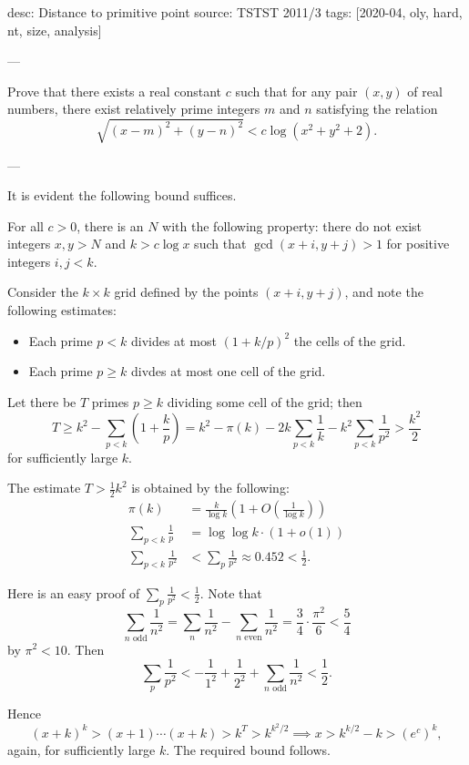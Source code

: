 desc: Distance to primitive point
source: TSTST 2011/3
tags: [2020-04, oly, hard, nt, size, analysis]

---

Prove that there exists a real constant $c$ such that for any pair $(x,y)$ of real numbers, there exist relatively prime integers $m$ and $n$ satisfying the relation \[\sqrt{(x-m)^2+(y-n)^2}<c\log\left(x^2+y^2+2\right).\]

---

It is evident the following bound suffices.
\begin{claim*}
    For all $c>0$, there is an $N$ with the following property: there do not exist integers $x,y>N$ and $k>c\log x$ such that $\gcd(x+i,y+j)>1$ for positive integers $i,j<k$.
\end{claim*}
Consider the $k\times k$ grid defined by the points $(x+i,y+j)$, and note the following estimates:
\begin{itemize}[itemsep=0em]
    \item Each prime $p<k$ divides at most $(1+k/p)^2$ the cells of the grid.
    \item Each prime $p\ge k$ divdes at most one cell of the grid.
\end{itemize}
Let there be $T$ primes $p\ge k$ dividing some cell of the grid; then
\[
    T\ge k^2-\sum_{p<k}\left(1+\frac kp\right)
    =k^2-\pi(k)-2k\sum_{p<k}\frac1k-k^2\sum_{p<k}\frac1{p^2}
    >\frac{k^2}2
\]
for sufficiently large $k$.
\begin{remark}
    The estimate $T>\tfrac12k^2$ is obtained by the following:
    \begin{align*}
        \pi(k)&=\frac k{\log k}\left(1+O\left(\frac1{\log k}\right)\right)\\
        \sum_{p<k}\frac1p&=\log\log k\cdot(1+o(1))\\
        \sum_{p<k}\frac1{p^2}&<\sum_p\frac1{p^2}\approx0.452<\frac12.
    \end{align*}
\end{remark}
\begin{remark}
    Here is an easy proof of $\sum_p\frac1{p^2}<\frac12$. Note that \[\sum_{n\text{ odd}}\frac1{n^2}=\sum_n\frac1{n^2}-\sum_{n\text{ even}}\frac1{n^2}=\frac34\cdot\frac{\pi^2}6<\frac54\]
    by $\pi^2<10$. Then \[\sum_p\frac1{p^2}<-\frac1{1^2}+\frac1{2^2}+\sum_{n\text{ odd}}\frac1{n^2}<\frac12.\]
\end{remark}
Hence \[(x+k)^k>(x+1)\cdots(x+k)>k^T>k^{k^2/2}\implies x>k^{k/2}-k>\left(e^c\right)^k,\]
again, for sufficiently large $k$. The required bound follows.
